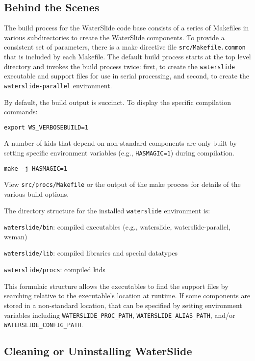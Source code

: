 \documentclass[11pt]{article}
\begin{document}
\subsection{Behind the Scenes}\label{sec-behind-scenes}

The build process for the WaterSlide code base consists of a series of Makefiles
in various subdirectories to create the WaterSlide components. To provide a
consistent set of parameters, there is a make directive file
\texttt{src/Makefile.common} that is included by each Makefile. The default build
process starts at the top level directory and invokes the build process twice:
first, to create the \texttt{waterslide} executable and support files for
use in serial processing, and second, to create the \texttt{waterslide-parallel} environment.

By default, the build output is succinct. To display the specific compilation
commands:
\nopagebreak
\begin{lstlisting}
export WS_VERBOSEBUILD=1
\end{lstlisting}

A number of kids that depend on non-standard components are only built by
setting specific environment variables (e.g., \texttt{HASMAGIC=1}) during compilation.
\nopagebreak
\begin{lstlisting}
make -j HASMAGIC=1
\end{lstlisting}
View \texttt{src/procs/Makefile} or the output of the make process for details of the various build
options.

The directory structure for the installed \texttt{waterslide} environment is:
\nopagebreak
\begin{itemize*}
\item \texttt{waterslide/bin}: compiled executables (e.g., waterslide, waterslide-parallel, wsman)
\item \texttt{waterslide/lib}: compiled libraries and special datatypes
\item \texttt{waterslide/procs}: compiled kids
\end{itemize*}
This formulaic structure allows the executables to find the support files by searching relative to
the executable's location at runtime. If some components are stored in a non-standard location, that
can be specified by setting environment variables including \texttt{WATERSLIDE\_PROC\_PATH},
\texttt{WATERSLIDE\_ALIAS\_PATH}, and/or \texttt{WATERSLIDE\_CONFIG\_PATH}.

\subsection{Cleaning or Uninstalling WaterSlide}
\end{document}
